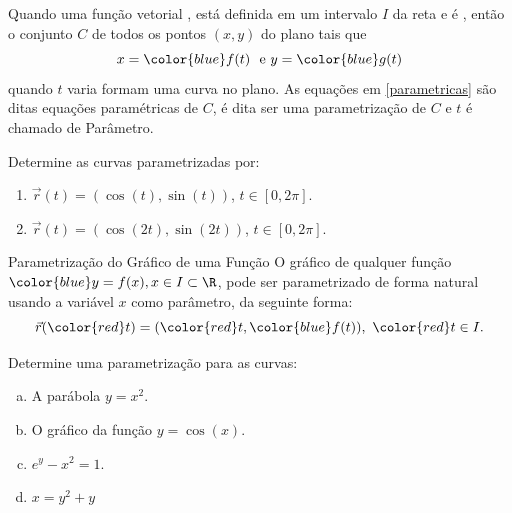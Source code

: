 
Quando uma função vetorial , está definida em um intervalo $I$ da reta e  é , então o conjunto {\color{red}$C$} de todos os pontos $(x,y)$ do plano tais que
\begin{equation}\label{parametricas}
x={\color{blue}f(t)}\ \text{ e } y={\color{blue}g(t)}
\end{equation}
quando $t$ varia formam uma {\color{red}curva no plano}. As equações em  {\color{red} \eqref{parametricas}} são ditas {\color{red} equações paramétricas de $C$},  é dita ser uma {\color{red}parametrização de $C$} e $t$ é chamado de  {\color{red} Parâmetro}.
\begin{exeb}{}{}
Determine as curvas parametrizadas por:
\begin{enumerate}
\item $\vec{r}(t)=(\cos(t),\sin(t))$, $t\in [0,2\pi]$.
\item $\vec{r}(t)=(\cos(2t),\sin(2t))$, $t\in [0,2\pi]$.

\end{enumerate}
\end{exeb}

\newpage


\begin{caixaazul}{Parametrização do Gráfico de uma Função}
O gráfico de qualquer função ${\color{blue}y=f(x)}, x\in I\subset\R$, pode ser parametrizado de forma natural usando a variável {\color{red}$x$ como parâmetro}, da seguinte forma:
\[\vec{r}({\color{red}t})=({\color{red}t},{\color{blue}f(t)}),\ {\color{red}t\in I}.\]
\end{caixaazul}

\begin{exeb}{}{}
 Determine uma parametrização para as curvas:
\begin{enumerate}[(a)]
\item A parábola $y=x^2$.
\item O gráfico da função \(y=\cos(x)\).
\item \(e^y-x^2=1\).
\item \(x=y^2+y\)
\end{enumerate}
\end{exeb}
\newpage




